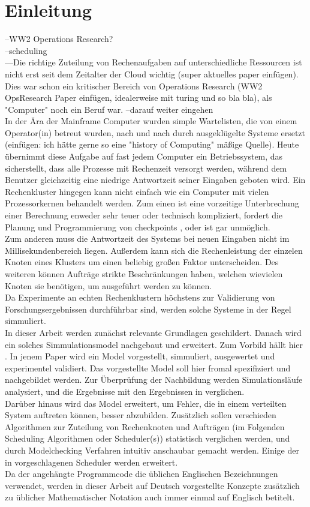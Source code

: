 \chapter{Einleitung}
\label{chap:ein}


--WW2 Operations Research?\\
--scheduling\\
---Die richtige Zuteilung von Rechenaufgaben auf unterschiedliche Ressourcen ist nicht erst seit dem Zeitalter der Cloud wichtig (super aktuelles paper einfügen). Dies war schon ein kritischer Bereich von Operations Research (WW2 OpsResearch Paper einfügen, idealerweise mit turing und so bla bla), als "Computer" noch ein Beruf war.
--darauf weiter eingehen\\

In der Ära der Mainframe Computer wurden simple Wartelisten, die von einem Operator(in) betreut wurden, nach und nach durch ausgeklügelte Systeme ersetzt (einfügen: ich hätte gerne so eine "history of Computing" mäßige Quelle). Heute übernimmt diese Aufgabe auf fast jedem Computer ein Betriebssystem, das sicherstellt, dass alle Prozesse mit Rechenzeit versorgt werden, während dem Benutzer gleichzeitig eine niedrige Antwortzeit seiner Eingaben geboten wird. Ein Rechenkluster hingegen kann nicht einfach wie ein Computer mit vielen Prozessorkernen behandelt werden. Zum einen ist eine vorzeitige Unterbrechung einer Berechnung enweder sehr teuer oder technisch kompliziert, fordert die Planung und Programmierung von checkpoints \cite{IPS15}, oder ist gar unmöglich.\\
Zum anderen muss die Antwortzeit des Systems bei neuen Eingaben nicht im Millisekundenbereich liegen. Außerdem kann sich die Rechenleistung der einzelen Knoten eines Klusters um einen beliebig großen Faktor unterscheiden.  Des weiteren können Aufträge strikte Beschränkungen haben, welchen wievielen Knoten sie benötigen, um ausgeführt werden zu können.\\
Da Experimente an echten Rechenklustern höchstens zur Validierung von Forschungsergebnissen durchführbar sind, werden solche Systeme in der Regel simmuliert.\\
In dieser Arbeit werden zunächst relevante Grundlagen geschildert.
Danach wird ein solches Simmulationsmodel nachgebaut und erweitert. Zum Vorbild hällt hier \cite{Arn99}. In jenem Paper wird ein Model vorgestellt, simmuliert, ausgewertet und experimentel validiert. Das vorgestellte Model soll hier fromal spezifiziert und nachgebildet werden. Zur Überprüfung der Nachbildung werden Simulationsläufe analysiert, und die Ergebnisse mit den Ergebnissen in \cite{Arn99} verglichen.\\
Darüber hinaus wird das Model erweitert, um Fehler, die in einem verteilten System auftreten können, besser abzubilden.
Zusätzlich sollen verschieden Algorithmen zur Zuteilung von Rechenknoten und Aufträgen (im Folgenden Scheduling Algorithmen oder Scheduler(s)) statistisch verglichen werden, und durch Modelchecking Verfahren intuitiv anschaubar gemacht werden. Einige der in \cite{Arn99} vorgeschlagenen Scheduler werden erweitert.\\


Da der angehängte Programmcode die üblichen Englischen Bezeichnungen verwendet, werden in dieser Arbeit auf Deutsch vorgestellte Konzepte zusätzlich zu üblicher Mathematischer Notation auch immer einmal auf Englisch betitelt.


